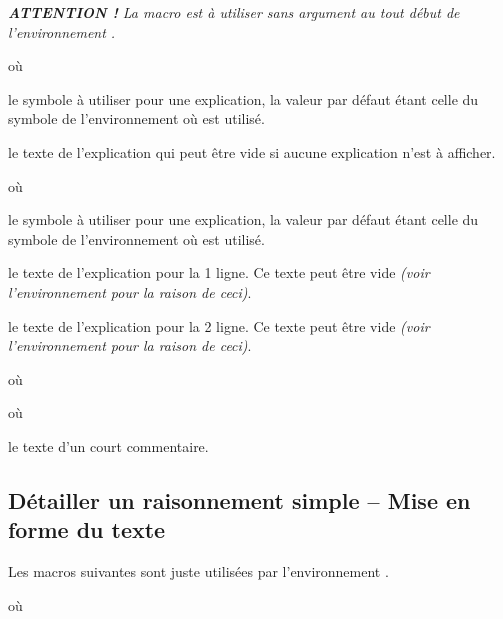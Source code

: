 \documentclass[12pt,a4paper]{article}
\begin{document}
\separation


\emph{\textbf{ATTENTION !} La macro  est à utiliser sans argument au tout début de l'environnement .}

\extraspace

\extraspace

 où \quad {}

\IDoption{} le symbole à utiliser pour une explication, la valeur par défaut étant celle du symbole de l'environnement  où  est utilisé.

\IDarg{} le texte de l'explication qui peut être vide si aucune explication n'est à afficher.


\separation


 où \quad {}

\IDoption{} le symbole à utiliser pour une explication, la valeur par défaut étant celle du symbole de l'environnement  où  est utilisé.

 le texte de l'explication pour la 1\iere{} ligne.
          Ce texte peut être vide \emph{(voir l'environnement  pour la raison de ceci)}.

 le texte de l'explication pour la 2\ieme{} ligne.
          Ce texte peut être vide \emph{(voir l'environnement  pour la raison de ceci)}.


\separation


 où \quad {}

 où \quad {}


\IDarg{} le texte d'un court commentaire.




\subsection{Détailler un raisonnement simple -- Mise en forme du texte}

Les macros suivantes sont juste utilisées par l'environnement .


\separation




\separation


 où \quad {}
\end{document}
